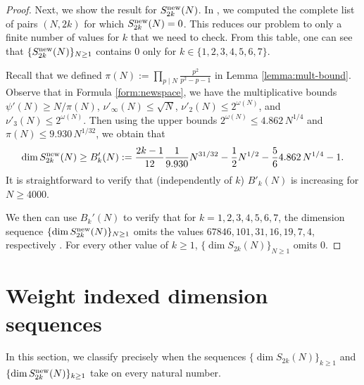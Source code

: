 \documentclass[12pt,letterpaper,reqno]{amsart}
\theoremstyle{definition}
\numberwithin{equation}{section}
\numberwithin{figure}{section}
\numberwithin{table}{section}
\newcommand{\nw}{{\textnormal{new}}}
\begin{document}
\begin{proof}
    Next, we show the result for $S_{2k}^\nw(N)$.
    In \cite[Tables 6.2]{ross}, we computed the complete list of pairs $(N,2k)$ for which $S_{2k}^\nw(N) = 0$. This reduces our problem to only a finite number of values for $k$ that we need to check. From this table, one can see that $\{S_{2k}^\nw(N)\}_{N\ge1}$ contains $0$ only for $k \in \{1,2,3,4,5,6,7\}$. 

    Recall that we defined $ \displaystyle
        \pi(N) := \prod_{p\mid N} 
            \frac{p^2}{p^2-p-1} 
    $ in Lemma \ref{lemma:mult-bound}.  Observe that in Formula \ref{form:newspace}, we have the multiplicative bounds $\psi'(N) \ge N / \pi(N)$, $\nu'_\infty(N) \le \sqrt{N}$, $\nu'_2(N) \le 2^{\omega(N)}$, and $\nu'_3(N) \le 2^{\omega(N)}$. Then using the upper bounds $2^{\omega(N)} \le 4.862 \, N^{1/4}$ and $\pi(N) \le 9.930\,N^{1/32}$, we obtain that
    \begin{align}
        \dim S_{2k}^\nw(N) \ge B'_k(N) := \frac{2k-1}{12} \frac{1}{9.930} N^{31/32} - \frac12 N^{1/2} - \frac56 4.862\, N^{1/4} - 1.
    \end{align}
    It is straightforward to verify that (independently of $k$) $B'_k(N)$ is increasing for $N \ge 4000$.

    We then can use $B_k'(N)$ to verify that for $k=1,2,3,4,5,6,7$,  the dimension sequence $\{ \dim S_{2k}^\nw(N) \}_{N\ge1}$ omits the values $67846,101,31,16,19,7,4$, respectively \cite{ross-code}. For every other value of $k \ge 1$, $\{ \dim S_{2k}(N) \}_{N\ge1}$ omits $0$.
\end{proof}


\section{Weight indexed dimension sequences}
In this section, we classify precisely when the sequences 
$\{ \dim S_{2k}(N) \}_{k\ge1}$ and $\{\dim S_{2k}^\nw(N) \}_{k\ge1}$ take on every natural number.
\end{document}
